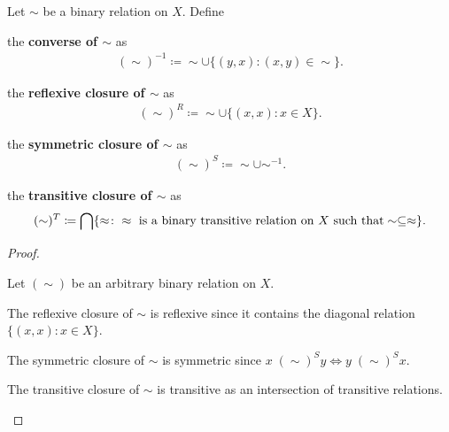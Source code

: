 \begin{definition}\label{def:derived_relations}
  Let \( \sim \) be a binary relation on \( X \). Define
  \begin{defenum}
     the \textbf{converse of \( \sim \)} as
    \begin{align*}
      (\sim)^{-1} \coloneqq \sim \cup \{ (y, x) \colon (x, y) \in \sim \}.
    \end{align*}

     the \textbf{reflexive closure of \( \sim \)} as
    \begin{align*}
      (\sim)^R \coloneqq \sim \cup \{ (x, x) \colon x \in X \}.
    \end{align*}

     the \textbf{symmetric closure of \( \sim \)} as
    \begin{align*}
      (\sim)^S \coloneqq \sim \cup \sim^{-1}.
    \end{align*}

     the \textbf{transitive closure of \( \sim \)} as
    \begin{align*}
      (\sim)^T \coloneqq \bigcap \{ \approx \colon \approx \text{ is a binary transitive relation on \( X \) such that} \sim \subseteq \approx \}.
    \end{align*}
  \end{defenum}
\end{definition}
\begin{proof}
\begin{itemize}
  Let \( (\sim) \) be an arbitrary binary relation on \( X \).

  \begin{description}
     The reflexive closure of \( \sim \) is reflexive since it contains the diagonal relation \( \{ (x, x) \colon x \in X \} \).

     The symmetric closure of \( \sim \) is symmetric since \( x \;(\sim)^S y \iff y \;(\sim)^S x \).

     The transitive closure of \( \sim \) is transitive as an intersection of transitive relations.
  \end{description}
\end{itemize}
\end{proof}
